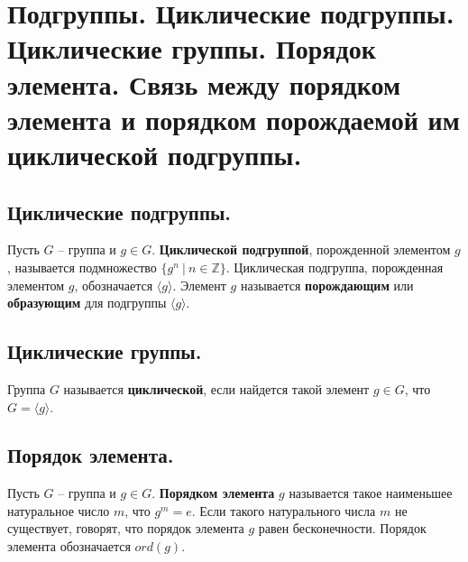 \section{Подгруппы. Циклические подгруппы. Циклические группы. Порядок элемента. Связь между порядком элемента и порядком порождаемой им циклической подгруппы.}


\subsection{Циклические подгруппы.}
\begin{definition}
    Пусть $G$ -- группа и $g \in G$. \textbf{Циклической подгруппой}, порожденной элементом $g$, называется подмножество $\{g^n \> | \> n \in \mathbb{Z} \}$. Циклическая подгруппа, порожденная элементом $g$, обозначается $\langle g \rangle$. Элемент $g$ называется \textbf{порождающим} или \textbf{образующим} для подгруппы $\langle g \rangle$.
\end{definition}

\subsection{Циклические группы.}
\begin{definition}
    Группа $G$ называется \textbf{циклической}, если найдется такой элемент $g \in G$, что $G = \langle g \rangle$.
\end{definition}

\subsection{Порядок элемента.}
\begin{definition}
    Пусть $G$ -- группа и $g \in G$. \textbf{Порядком элемента} $g$ называется такое наименьшее натуральное число $m$, что $g^m = e$. Если такого натурального числа $m$ не существует, говорят, что порядок элемента $g$ равен бесконечности.
    Порядок элемента обозначается $ord(g)$.
\end{definition}


